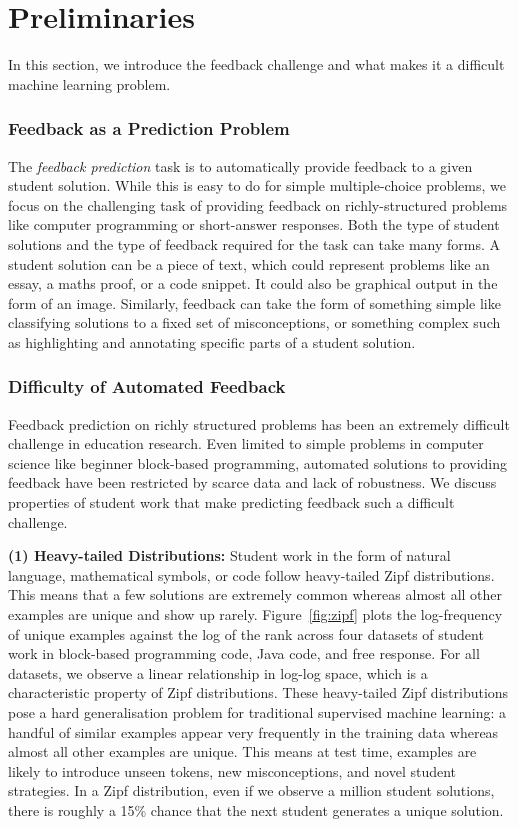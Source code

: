 \section{Preliminaries}
\label{sec:background}
In this section, we introduce the feedback challenge and what makes it a difficult machine learning problem. 

\subsubsection{Feedback as a Prediction Problem}
The \textit{feedback prediction} task is to automatically provide feedback to a given student solution. While this is easy to do for simple multiple-choice problems, we focus on the challenging task of providing feedback on richly-structured problems like computer programming or short-answer responses.
Both the type of student solutions and the type of feedback required for the task can take many forms. A student solution can be a piece of text, which could represent problems like an essay, a maths proof, or a code snippet. It could also be graphical output in the form of an image. Similarly, feedback can take the form of something simple like classifying solutions to a fixed set of misconceptions, or something complex such as highlighting and annotating specific parts of a student solution.

\subsubsection{Difficulty of Automated Feedback}
\label{sec:difficulty}

Feedback prediction on richly structured problems has been an extremely difficult challenge in education research. Even limited to simple problems in computer science like beginner block-based programming, automated solutions to providing feedback have been restricted by scarce data and lack of robustness. 
We discuss properties of student work that make predicting feedback such a difficult challenge.\newline

\noindent\textbf{(1) Heavy-tailed Distributions:} Student work in the form of natural language, mathematical symbols, or code follow heavy-tailed Zipf distributions. This means that a few solutions are extremely common whereas almost all other examples are unique and show up rarely. Figure~\ref{fig:zipf} plots the log-frequency of unique examples against the log of the rank across four datasets of student work in block-based programming code, Java code, and free response. For all datasets, we observe a linear relationship in log-log space, which is a characteristic property of Zipf distributions. 
These heavy-tailed Zipf distributions pose a hard generalisation problem for traditional supervised machine learning: a handful of similar examples appear very frequently in the training data whereas almost all other examples are unique. This means at test time, examples are likely to introduce unseen tokens, new misconceptions, and novel student  strategies. In a Zipf distribution, even if we observe a million student solutions, there is roughly a 15\% chance that the next student generates a unique solution.\newline

